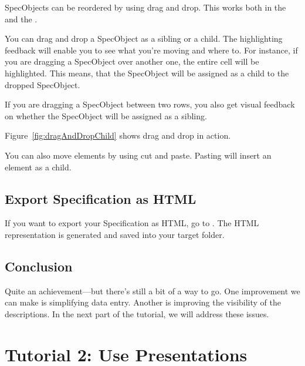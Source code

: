 SpecObjects can be reordered by using drag and drop.  This works both in the  and the .

You can drag and drop a SpecObject as a sibling or a child.  The highlighting feedback will enable you to see what you're moving and where to.  For instance, if you are dragging a SpecObject over another one, the entire cell will be highlighted.  This means, that the SpecObject will be assigned as a child to the dropped SpecObject.

If you are dragging a SpecObject between two rows, you also get visual feedback on whether the SpecObject will be assigned as a sibling.

Figure~\ref{fig:dragAndDropChild} shows drag and drop in action.

You can also move elements by using cut and paste.  Pasting will insert an element as a child.

\subsection{Export Specification as HTML}

If you want to export your Specification as HTML, go to .  The HTML representation is generated and saved into your target folder.

\subsection{Conclusion}

Quite an achievement—but there's still a bit of a way to go.  One improvement we can make is simplifying data entry.  Another is improving  the visibility of the descriptions.  In the next part of the tutorial, we will address these issues.

\section{Tutorial 2: Use Presentations}

